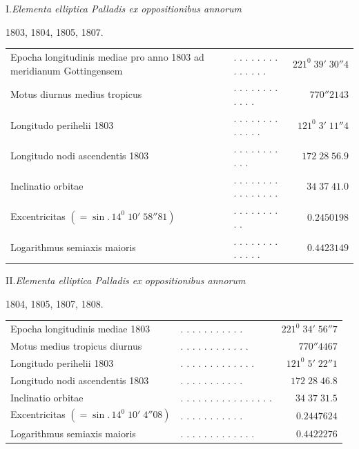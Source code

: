 \begin{center}I.\quad\textit{Elementa elliptica Palladis ex oppositionibus annorum}\par
1803, 1804, 1805, 1807.\end{center}
\begingroup\small\setlength{\tabcolsep}{2pt}
\noindent\begin{tabular}{@{}p{.51\linewidth}lr@{}}
Epocha longitudinis mediae pro anno 1803 ad meridianum Gottingensem&. . . . . . . . . . . . . .&$221^0\;39'\;30''4$\\
Motus diurnus medius tropicus&. . . . . . . . . . . .&$770''2143$\\
Longitudo perihelii 1803&. . . . . . . . . . . . .&$121^0\;3'\;11''4$\\
Longitudo nodi ascendentis 1803&. . . . . . . . . . .&$172\;28\;56.9$\\
Inclinatio orbitae&. . . . . . . . . . . . . . . .&$34\;37\;41.0$\\
Excentricitas $(=\sin.\,14^0\;10'\;58''81)$&. . . . . . . . . .&$0.2450198$\\
Logarithmus semiaxis maioris&. . . . . . . . . . . . .&$0.4423149$
\end{tabular}\par\endgroup

\begin{center}II.\quad\textit{Elementa elliptica Palladis ex oppositionibus annorum}\par
1804, 1805, 1807, 1808.\end{center}
\begingroup\small\setlength{\tabcolsep}{2pt}
\noindent\begin{tabular}{@{}p{.51\linewidth}lr@{}}
Epocha longitudinis mediae 1803&. . . . . . . . . . .&$221^0\;34'\;56''7$\\
Motus medius tropicus diurnus&. . . . . . . . . . . .&$770''4467$\\
Longitudo perihelii 1803&. . . . . . . . . . . . .&$121^0\;5'\;22''1$\\
Longitudo nodi ascendentis 1803&. . . . . . . . . . .&$172\;28\;46.8$\\
Inclinatio orbitae&. . . . . . . . . . . . . . . .&$34\;37\;31.5$\\
Excentricitas $(=\sin.\,14^0\;10'\;4''08)$&. . . . . . . . . . .&$0.2447624$\\
Logarithmus semiaxis maioris&. . . . . . . . . . . . .&$0.4422276$
\end{tabular}\par\endgroup

